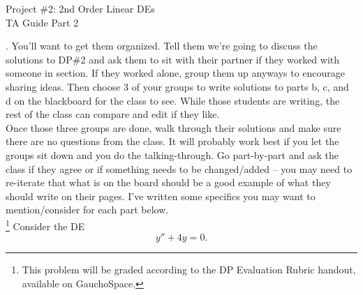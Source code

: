 \documentclass[epsf]{article}
\begin{document}
\newcommand{\R}{\mathbb{R}}
\newcommand{\noi}{\noindent}
\newcommand{\bs}{\bigskip}






\begin{center}
{\Large Project \#2: 2nd Order Linear DEs\\
\vskip 2mm
TA Guide Part 2}
\end{center}

\noi {\bf 1}.  You'll want to get them organized.  Tell them we're going to discuss the solutions to DP\#2 and ask them to sit with their partner if they worked with someone in section.    If they worked alone, group them up anyways to encourage sharing ideas.  Then choose 3 of your groups to write solutions to parts b, c, and d on the blackboard for the class to see.  While those students are writing, the rest of the class can compare and edit if they like. \\

Once those three groups are done, walk through their solutions and make sure there are no questions from the class.  It will probably work best if you let the groups sit down and you do the talking-through.  Go part-by-part and ask the class if they agree or if something needs to be changed/added -- you may need to re-iterate that what is on the board should be a good example of what they should write on their pages.  I've written some specifics you may want to mention/consider for each part below.\\


 \footnote{This problem will be graded according to the DP Evaluation Rubric handout, available on GauchoSpace.}  Consider the DE $$y'' + 4y = 0.$$
\end{document}
